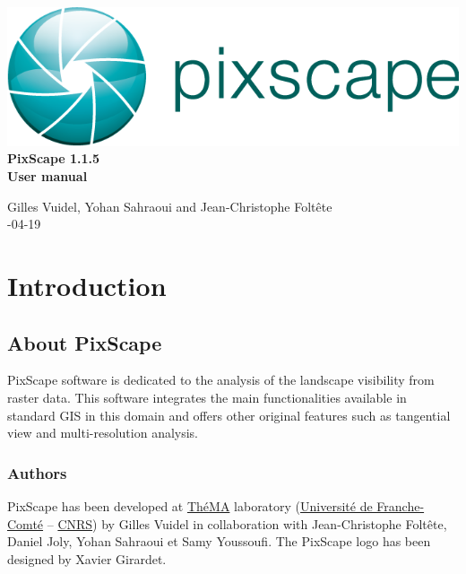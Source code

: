\documentclass{report}
\begin{document}
 \begin{titlepage}
	
	\centering
	\includegraphics[scale=0.5]{img/logo.png}\\
	
	\bigskip
	\bigskip
	\bigskip	
	{\Huge
		\bfseries
		PixScape 1.1.5\\
		\bigskip
		User manual\\
	}
	\bigskip
	\bigskip
	\bigskip
	\bigskip
	\bigskip
	
	{\Large		
		Gilles Vuidel, Yohan Sahraoui and Jean-Christophe Foltête\\
		-04-19\\
	}
	
\end{titlepage}

\setcounter{tocdepth}{2}
\tableofcontents

\pagebreak

\chapter{Introduction}

\section{About PixScape}

PixScape software is dedicated to the analysis of the landscape visibility from raster data.
This software integrates the main functionalities available in standard GIS  in this domain and offers other original features such as tangential view and multi-resolution analysis.


\subsection{Authors}
PixScape has been developed at \href{http://thema.univ-fcomte.fr}{ThéMA} laboratory (\href{http://www.univ-fcomte.fr}{Université de Franche-Comté} – \href{http://www.cnrs.fr}{CNRS}) by Gilles Vuidel in collaboration with Jean-Christophe Foltête, Daniel Joly, Yohan Sahraoui et Samy Youssoufi. The PixScape logo has been designed by Xavier Girardet.
\end{document}
